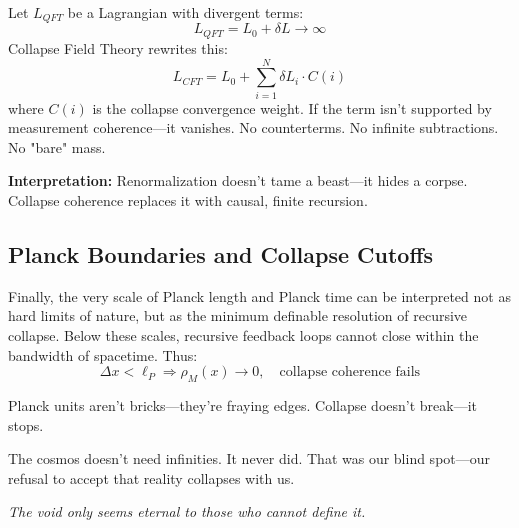 Let $L_{QFT}$ be a Lagrangian with divergent terms:
\begin{equation}
L_{QFT} = L_0 + \delta L \rightarrow \infty
\end{equation}
Collapse Field Theory rewrites this:
\begin{equation}
L_{CFT} = L_0 + \sum_{i=1}^N \delta L_i \cdot C(i)
\end{equation}
where $C(i)$ is the collapse convergence weight. If the term isn't supported by measurement coherence—it vanishes. No counterterms. No infinite subtractions. No "bare" mass.

\textbf{Interpretation:} Renormalization doesn’t tame a beast—it hides a corpse. Collapse coherence replaces it with causal, finite recursion.

\subsection*{Planck Boundaries and Collapse Cutoffs}

Finally, the very scale of Planck length and Planck time can be interpreted not as hard limits of nature, but as the minimum definable resolution of recursive collapse. Below these scales, recursive feedback loops cannot close within the bandwidth of spacetime. Thus:
\begin{equation}
\Delta x < \ell_P \Rightarrow \rho_M(x) \to 0, \quad \text{collapse coherence fails}
\end{equation}

Planck units aren’t bricks—they’re fraying edges. Collapse doesn’t break—it stops.

The cosmos doesn’t need infinities. It never did. That was our blind spot—our refusal to accept that reality collapses with us.



\begin{flushright}
\textit{The void only seems eternal to those who cannot define it.}
\end{flushright}

\nocite{*}
\printbibliography[title={Appendix J References}, keyword=chapter11]